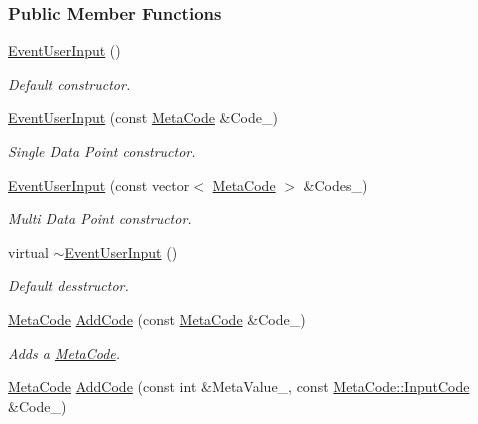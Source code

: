 \subsubsection*{Public Member Functions}
\begin{DoxyCompactItemize}
\item 
\hyperlink{classMezzanine_1_1EventUserInput_a3d5857827ca69112a5acfc715ff29814}{EventUserInput} ()
\begin{DoxyCompactList}\small\item\em Default constructor. \item\end{DoxyCompactList}\item 
\hyperlink{classMezzanine_1_1EventUserInput_ac54a20c16138388b64a86d8ed13854bb}{EventUserInput} (const \hyperlink{classMezzanine_1_1MetaCode}{MetaCode} \&Code\_\-)
\begin{DoxyCompactList}\small\item\em Single Data Point constructor. \item\end{DoxyCompactList}\item 
\hyperlink{classMezzanine_1_1EventUserInput_aa29e31d1d166c54fd8b87a2dc50cebb6}{EventUserInput} (const vector$<$ \hyperlink{classMezzanine_1_1MetaCode}{MetaCode} $>$ \&Codes\_\-)
\begin{DoxyCompactList}\small\item\em Multi Data Point constructor. \item\end{DoxyCompactList}\item 
virtual \hyperlink{classMezzanine_1_1EventUserInput_ad5bb99302139d9a69cb2d71ee1784300}{$\sim$EventUserInput} ()
\begin{DoxyCompactList}\small\item\em Default desstructor. \item\end{DoxyCompactList}\item 
\hyperlink{classMezzanine_1_1MetaCode}{MetaCode} \hyperlink{classMezzanine_1_1EventUserInput_aa2021a2bec834207a78bad0338714d83}{AddCode} (const \hyperlink{classMezzanine_1_1MetaCode}{MetaCode} \&Code\_\-)
\begin{DoxyCompactList}\small\item\em Adds a \hyperlink{classMezzanine_1_1MetaCode}{MetaCode}. \item\end{DoxyCompactList}\item 
\hyperlink{classMezzanine_1_1MetaCode}{MetaCode} \hyperlink{classMezzanine_1_1EventUserInput_aaf966edbc281d55457e86e2039e87dd7}{AddCode} (const int \&MetaValue\_\-, const \hyperlink{classMezzanine_1_1MetaCode_a3b5633f0145bf3287cf53a3f05b5563c}{MetaCode::InputCode} \&Code\_\-)

\end{DoxyCompactItemize}

